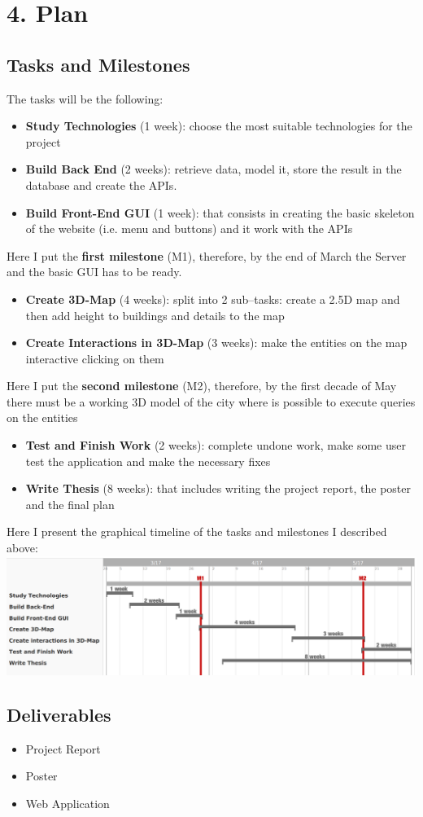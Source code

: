 \documentclass[11pt]{report}
\begin{document}
\section*{4. Plan}
\subsection*{Tasks and Milestones}
The tasks will be the following:
\begin{itemize}
	\item {\bf Study Technologies} (1 week): choose the most suitable technologies for the project
	\item {\bf Build Back End} (2 weeks): retrieve data, model it, store the result in the database and create the APIs.
	\item {\bf Build Front-End GUI} (1 week): that consists in creating the basic skeleton of the website (i.e. menu and buttons) and it work with the APIs
\end{itemize}
Here I put the {\bf first milestone} (M1), therefore, by the end of March the Server and the basic GUI has to be ready.
\begin{itemize}
	\item {\bf Create 3D-Map} (4 weeks): split into 2 sub--tasks: create a 2.5D map and then add height to buildings and details to the map
	\item {\bf Create Interactions in 3D-Map} (3 weeks): make the entities on the map interactive clicking on them
\end{itemize}
Here I put the {\bf second milestone} (M2), therefore, by the first decade of May there must be a working 3D model of the city where is possible to execute queries on the entities
\begin{itemize}
	\item {\bf Test and Finish Work} (2 weeks): complete undone work, make some user test the application and make the necessary fixes
	\item {\bf Write Thesis} (8 weeks): that includes writing the project report, the poster and the final plan
\end{itemize}
Here I present the graphical timeline of the tasks and milestones I described above:\\

\hspace*{-3cm}\includegraphics[scale=0.5]{Plan_timeline}
\\
\subsection*{Deliverables}
\begin{itemize}
	\item Project Report
	\item Poster
	\item Web Application
\end{itemize}
\end{document}
